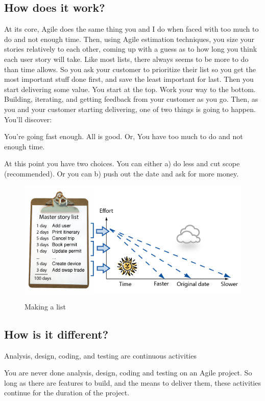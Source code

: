 \subsection{How does it work?}
At its core, Agile does the same thing you and I do when faced with too much to do and not enough time. Then, using Agile estimation techniques, you size your stories relatively to each other, coming up with a guess as to how long you think each user story will take. Like most lists, there always seems to be more to do than time allows. So you ask your customer to prioritize their list so you get the most important stuff done first, and save the least important for last. Then you start delivering some value. You start at the top. Work your way to the bottom. Building, iterating, and getting feedback from your customer as you go. Then, as you and your customer starting delivering, one of two things is going to happen. You'll discover:

    You're going fast enough. All is good. Or,
    You have too much to do and not enough time.

At this point you have two choices. You can either a) do less and cut scope (recommended). Or you can b) push out the date and ask for more money.

\begin{figure}[htbp]
\center \includegraphics[width=400pt]{figures/update-the-plan}\\
\caption{Making a list \citep{AIAN-16}} \label{Figure: Making a list}
\label{fig:agile}
\end{figure}

\subsection{How is it different?}
Analysis, design, coding, and testing are continuous activities

You are never done analysis, design, coding and testing on an Agile project. So long as there are features to build, and the means to deliver them, these activities continue for the duration of the project.

